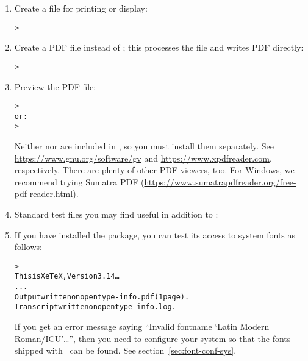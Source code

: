 \documentclass{article}
\begin{document}
\begin{enumerate}
\item Create a \PS{} file for printing or display:
\begin{alltt}
> 
\end{alltt}

\item Create a PDF file instead of \dvi{}; this processes the
 file and writes PDF directly:
\begin{alltt}
> 
\end{alltt}

\item Preview the PDF file:
\begin{alltt}
> 
\textrm{or:}
> 
\end{alltt}
Neither  nor  are included in \TL{}, so
you must install them separately.  See
\url{https://www.gnu.org/software/gv} and
\url{https://www.xpdfreader.com}, respectively.  There are plenty
of other PDF viewers, too.  For Windows, we recommend trying Sumatra
PDF (\url{https://www.sumatrapdfreader.org/free-pdf-reader.html}).

\item Standard test files you may find useful in addition to
:


\item If you have installed the  package, you can test
its access to system fonts as follows:
\begin{alltt}
> 
This is XeTeX, Version 3.14\dots
...
Output written on opentype-info.pdf (1 page).
Transcript written on opentype-info.log.
\end{alltt}

If you get an error message saying ``Invalid fontname `Latin Modern
Roman/ICU'\dots'', then you need to configure your system so that the
fonts shipped with \TL\ can be found.  See
section~\ref{sec:font-conf-sys}.

\end{enumerate}
\end{document}
